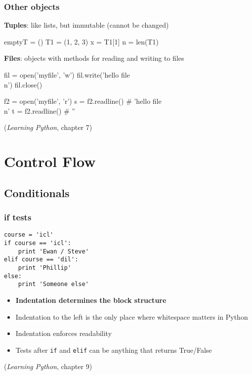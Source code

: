 \begin{frame}
  \frametitle{Other objects}
  
  \textbf{Tuples}: like lists, but immutable (cannot be changed)
  \pause
\begin{semiverbatim}\small
emptyT = () \newline
T1 = (1, 2, 3)\newline
x = T1[1]\newline
n = len(T1)
\end{semiverbatim}

  \pause
  \textbf{Files}:  objects with methods for reading and writing to files
    \pause
\begin{semiverbatim}\small
fil = open('myfile', 'w')\newline
fil.write('hello file\\n')\newline
fil.close()\newline
\end{semiverbatim}
\pause
\begin{semiverbatim}\small
f2 = open('myfile', 'r')\newline
s = f2.readline() \# 'hello file\\n'\newline
t = f2.readline() \# ''
\end{semiverbatim}
    (\emph{Learning Python}, chapter 7)    
\end{frame}

\section{Control Flow}

\subsection{Conditionals}
\begin{frame}[fragile]
  \frametitle{if tests}
{\small
\begin{verbatim}
course = 'icl'
if course == 'icl':
    print 'Ewan / Steve'
elif course == 'dil':
    print 'Phillip'
else:
    print 'Someone else'
\end{verbatim}}
  \pause
  \begin{itemize}
  \item \textbf{Indentation determines the block structure}
  \item Indentation to the left is the only place where whitespace
    matters in Python
  \item Indentation enforces readability
  \item Tests after \texttt{if} and \texttt{elif} can be anything that
    returns True/False
  \end{itemize}
    (\emph{Learning Python}, chapter 9)    
\end{frame}


